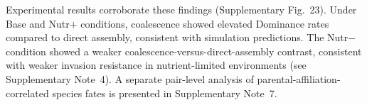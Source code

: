 Experimental results corroborate these findings (Supplementary Fig.~23). Under Base and Nutr$+$ conditions, coalescence showed elevated Dominance rates compared to direct assembly, consistent with simulation predictions. The Nutr$-$ condition showed a weaker coalescence-versus-direct-assembly contrast, consistent with weaker invasion resistance in nutrient-limited environments (see Supplementary Note~4). A separate pair-level analysis of parental-affiliation-correlated species fates is presented in Supplementary Note~7.
